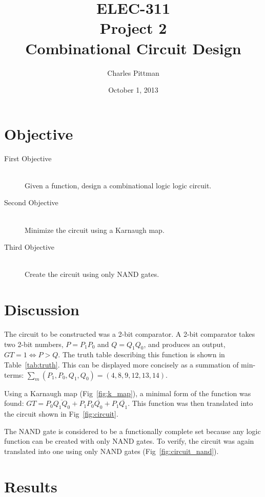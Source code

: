 \documentclass{article}
\author{Charles Pittman}
\title{ELEC-311\\ Project 2\\ Combinational Circuit Design}
\date{October 1, 2013}
\begin{document}
\maketitle %

\pagebreak

\renewcommand{\labelenumi}{\alph{enumi}.}

\section{Objective}
\label{sec:objective}

 \begin{description}
 \item[First Objective] \hfill \\
   Given a function, design a combinational logic logic circuit.
 \item[Second Objective] \hfill \\
   Minimize the circuit using a Karnaugh map.
 \item[Third Objective] \hfill \\
   Create the circuit using only NAND gates.
 \end{description}

\section{Discussion}
\label{sec:procedure}

The circuit to be constructed was a 2-bit comparator.  A 2-bit
comparator takes two 2-bit numbers, $P = P_1P_0$ and $Q = Q_1Q_0$, and
produces an output, $GT=1 \iff P>Q$.  The truth table describing this
function is shown in Table~\ref{tab:truth}.  This can be displayed
more concisely as a summation of min-terms: $\sum_m(P_1, P_0, Q_1,
Q_0) = (4, 8, 9, 12, 13,14)$.

Using a Karnaugh map (Fig~\ref{fig:k_map}), a minimal form of the
function was found: $GT = P_0 \overline{Q_1 Q_0} + P_1 P_0
\overline{Q_0} + P_1 \overline{Q_1}$.  This function was then
translated into the circuit shown in Fig~\ref{fig:circuit}.

The NAND gate is considered to be a functionally complete set because
any logic function can be created with only NAND gates.  To verify, the
circuit was again translated into one using only NAND gates
(Fig~\ref{fig:circuit_nand}).

\section{Results}
\label{sec:results}
\end{document}

